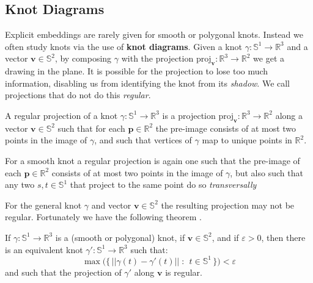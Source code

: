     \subsection{Knot Diagrams}
        Explicit embeddings are rarely given for smooth or polygonal knots.
        Instead we often study knots via the use of \textbf{knot diagrams}.
        Given a knot $\gamma:\mathbb{S}^{1}\rightarrow\mathbb{R}^{3}$ and a
        vector $\mathbf{v}\in\mathbb{S}^{2}$, by composing $\gamma$ with the
        projection
        $\textrm{proj}_{\mathbf{v}}:\mathbb{R}^{3}\rightarrow\mathbb{R}^{2}$ we
        get a drawing in the plane. It is possible for the projection to lose
        too much information, disabling us from identifying the knot from its
        \textit{shadow}. We call projections that do not do this
        \textit{regular}.
        \begin{definition}
            A regular projection of a knot
            $\gamma:\mathbb{S}^{1}\rightarrow\mathbb{R}^{3}$ is a projection
            $\textrm{proj}_{\mathbf{v}}:\mathbb{R}^{3}\rightarrow\mathbb{R}^{2}$
            along a vector $\mathbf{v}\in\mathbb{S}^{2}$ such that for each
            $\mathbf{p}\in\mathbb{R}^{2}$ the pre-image consists of at most two
            points in the image of $\gamma$, and such that vertices of
            $\gamma$ map to unique points in $\mathbb{R}^{2}$.
        \end{definition}
        For a smooth knot a regular projection is again one such that the
        pre-image of each $\mathbf{p}\in\mathbb{R}^{2}$ consists of at most two
        points in the image of $\gamma$, but also such that any two
        $s,t\in\mathbb{S}^{1}$ that project to the same point do so
        \textit{transversally}
        \par\hfill\par
        For the general knot $\gamma$ and vector $\mathbf{v}\in\mathbb{S}^{2}$
        the resulting projection may not be regular. Fortunately we have the
        following theorem \cite[p.~22]{LivingstonKnotTheory}.
        \begin{theorem}
            If $\gamma:\mathbb{S}^{1}\rightarrow\mathbb{R}^{3}$ is a
            (smooth or polygonal) knot, if $\mathbf{v}\in\mathbb{S}^{2}$, and if
            $\varepsilon>0$, then there is an equivalent knot
            $\gamma':\mathbb{S}^{1}\rightarrow\mathbb{R}^{3}$ such that:
            \begin{equation}
                \max\big(
                    \{\,||\gamma(t)-\gamma'(t)||\;:\;\,t\in\mathbb{S}^{1}\,\}
                \big)<\varepsilon
            \end{equation}
            and such that the projection of $\gamma'$ along $\mathbf{v}$
            is regular.
        \end{theorem}
